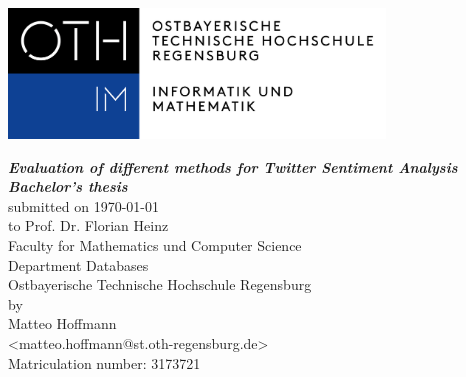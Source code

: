 \begin{titlepage}

\includegraphics[angle=0,width=10cm]{Titelseite/oth.png}

\begin{center}
\vspace*{2\baselineskip}
\LARGE \textbf{\textsf{\textit{
Evaluation of different methods for Twitter Sentiment Analysis
}}} \\
\vspace{1cm}
\LARGE\textbf{\textsf{\textit{Bachelor's thesis}}} \\
\vspace{1cm}
\Large{
submitted on \today \\
to Prof. Dr. Florian Heinz \\
Faculty for Mathematics und Computer Science \\
Department Databases \\
Ostbayerische Technische Hochschule Regensburg \\
\vspace{1cm}
by \\
Matteo Hoffmann \\
<matteo.hoffmann@st.oth-regensburg.de> \\
Matriculation number: 3173721 \\
}
\vspace{1cm}

\end{center}

\end{titlepage}

